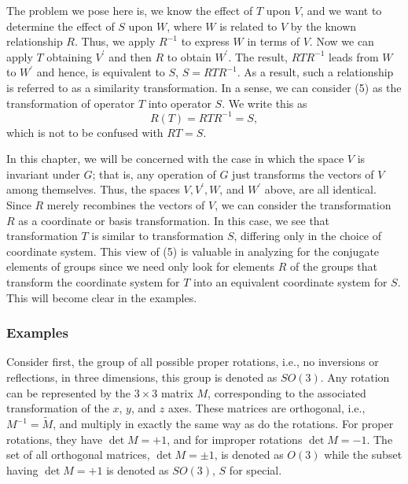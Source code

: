 \begin{figure}
\caption{}
\label{chap16-fig1}
\end{figure}

The problem we pose here is, we know the effect of $T$ upon $V$, and we 
want to determine the effect of $S$ upon $W$, where $W$ is related to 
$V$ by the known relationship $R$.  Thus, we apply $R^{-1}$ to 
express $W$ in terms of $V$.  Now we can apply $T$ obtaining 
$V^{\prime}$ and then $R$ to obtain $W^{\prime}$.  The result, 
$RTR^{-1}$ leads from $W$ to $W^{\prime}$ and hence, is equivalent to 
$S$, $S = RTR^{-1}$.  As a result, such a relationship is referred to 
as a similarity transformation.  In a sense, we can consider (5) as the 
transformation of operator $T$ into operator $S$.  We write this as
\begin{equation}
R(T) = RTR^{-1} = S,
\label{chap16-eqno6}
\end{equation}
which is not to be confused with $RT=S$.

In this chapter, we will be concerned with the case in which the 
space $V$ is invariant under $G$; that is, any operation of $G$ just 
transforms the vectors of $V$ among themselves.  Thus, the spaces 
$V,V^{\prime},W$, and $W^{\prime}$ above, are all identical.  Since 
$R$ merely recombines the vectors of $V$, we can consider the 
transformation $R$ as a coordinate or basis transformation.  In this 
case, we see that transformation $T$ is similar to transformation $S$, 
differing only in the choice of coordinate system.  This view of (5) is 
valuable in analyzing for the conjugate elements of groups since we 
need only look for elements $R$ of the groups that transform the 
coordinate system for $T$ into an equivalent coordinate system for $S$. 
This will become clear in the examples.

\subsubsection{Examples}

Consider first, the group of all possible proper rotations, i.e., no 
inversions or reflections, in three dimensions, this group is denoted 
as $SO(3)$.  Any rotation can be represented by the $3 \times 3$ 
matrix $M$, corresponding to the associated transformation of the 
$x$, $y$, and $z$ axes.  These matrices are orthogonal, i.e., 
$M^{-1} = {\tilde{M}}$, and multiply in exactly the same way as do 
the rotations.  For proper rotations, they have $\det M = +1$, and 
for improper rotations $\det M = -1$.  The set of all orthogonal 
matrices, $\det M = \pm 1$, is denoted as $O(3)$ while the subset 
having $\det M = +1$ is denoted as $SO(3)$, $S$ for special.

